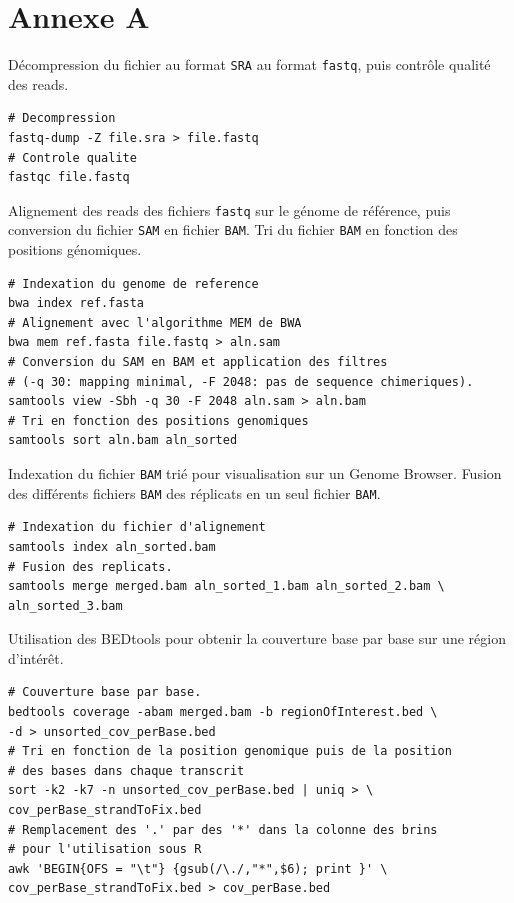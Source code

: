 \documentclass[12pt,a4paper]{report}
\begin{document}
\cleardoublepage
{}


\printglossary[type=\acronymtype ,title=Glossaire]


\thispagestyle{empty}
\appendix

\chapter*{Annexe A}
\label{annexeCode}

Décompression du fichier au format \texttt{SRA} au format \texttt{fastq}, puis contrôle qualité des reads.
\begin{lstlisting}[frame=single]
# Decompression
fastq-dump -Z file.sra > file.fastq
# Controle qualite
fastqc file.fastq
\end{lstlisting}

Alignement des reads des fichiers \texttt{fastq} sur le génome de référence, puis conversion du fichier \texttt{SAM} en fichier \texttt{BAM}. Tri du fichier \texttt{BAM} en fonction des positions génomiques. 
\begin{lstlisting}[frame=single]
# Indexation du genome de reference
bwa index ref.fasta
# Alignement avec l'algorithme MEM de BWA
bwa mem ref.fasta file.fastq > aln.sam
# Conversion du SAM en BAM et application des filtres
# (-q 30: mapping minimal, -F 2048: pas de sequence chimeriques).
samtools view -Sbh -q 30 -F 2048 aln.sam > aln.bam
# Tri en fonction des positions genomiques
samtools sort aln.bam aln_sorted
\end{lstlisting}

Indexation du fichier \texttt{BAM} trié pour visualisation sur un Genome Browser. Fusion des différents fichiers \texttt{BAM} des réplicats en un seul fichier \texttt{BAM}.
\begin{lstlisting}[frame=single]
# Indexation du fichier d'alignement
samtools index aln_sorted.bam
# Fusion des replicats.
samtools merge merged.bam aln_sorted_1.bam aln_sorted_2.bam \
aln_sorted_3.bam
\end{lstlisting}

Utilisation des BEDtools pour obtenir la couverture base par base sur une région d'intérêt.
\lstset{language=sh, commentstyle=\color{ForestGreen}}  
\begin{lstlisting}[frame=single]
# Couverture base par base.
bedtools coverage -abam merged.bam -b regionOfInterest.bed \
-d > unsorted_cov_perBase.bed
# Tri en fonction de la position genomique puis de la position 
# des bases dans chaque transcrit
sort -k2 -k7 -n unsorted_cov_perBase.bed | uniq > \
cov_perBase_strandToFix.bed
# Remplacement des '.' par des '*' dans la colonne des brins 
# pour l'utilisation sous R
awk 'BEGIN{OFS = "\t"} {gsub(/\./,"*",$6); print }' \
cov_perBase_strandToFix.bed > cov_perBase.bed
\end{lstlisting}
\end{document}
